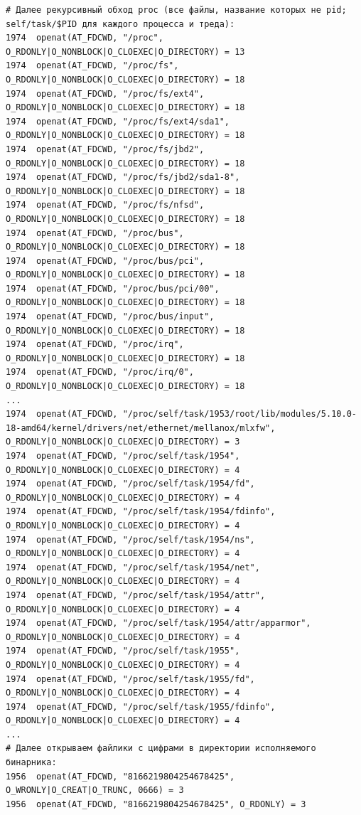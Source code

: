 \documentclass[11pt, a4paper]{article}
\begin{document}
\begin{Verbatim}[fontsize=\small,breaklines=true]
# Далее рекурсивный обход proc (все файлы, название которых не pid; self/task/$PID для каждого процесса и треда):
1974  openat(AT_FDCWD, "/proc", O_RDONLY|O_NONBLOCK|O_CLOEXEC|O_DIRECTORY) = 13
1974  openat(AT_FDCWD, "/proc/fs", O_RDONLY|O_NONBLOCK|O_CLOEXEC|O_DIRECTORY) = 18
1974  openat(AT_FDCWD, "/proc/fs/ext4", O_RDONLY|O_NONBLOCK|O_CLOEXEC|O_DIRECTORY) = 18
1974  openat(AT_FDCWD, "/proc/fs/ext4/sda1", O_RDONLY|O_NONBLOCK|O_CLOEXEC|O_DIRECTORY) = 18
1974  openat(AT_FDCWD, "/proc/fs/jbd2", O_RDONLY|O_NONBLOCK|O_CLOEXEC|O_DIRECTORY) = 18
1974  openat(AT_FDCWD, "/proc/fs/jbd2/sda1-8", O_RDONLY|O_NONBLOCK|O_CLOEXEC|O_DIRECTORY) = 18
1974  openat(AT_FDCWD, "/proc/fs/nfsd", O_RDONLY|O_NONBLOCK|O_CLOEXEC|O_DIRECTORY) = 18
1974  openat(AT_FDCWD, "/proc/bus", O_RDONLY|O_NONBLOCK|O_CLOEXEC|O_DIRECTORY) = 18
1974  openat(AT_FDCWD, "/proc/bus/pci", O_RDONLY|O_NONBLOCK|O_CLOEXEC|O_DIRECTORY) = 18
1974  openat(AT_FDCWD, "/proc/bus/pci/00", O_RDONLY|O_NONBLOCK|O_CLOEXEC|O_DIRECTORY) = 18
1974  openat(AT_FDCWD, "/proc/bus/input", O_RDONLY|O_NONBLOCK|O_CLOEXEC|O_DIRECTORY) = 18
1974  openat(AT_FDCWD, "/proc/irq", O_RDONLY|O_NONBLOCK|O_CLOEXEC|O_DIRECTORY) = 18
1974  openat(AT_FDCWD, "/proc/irq/0", O_RDONLY|O_NONBLOCK|O_CLOEXEC|O_DIRECTORY) = 18
...
1974  openat(AT_FDCWD, "/proc/self/task/1953/root/lib/modules/5.10.0-18-amd64/kernel/drivers/net/ethernet/mellanox/mlxfw", O_RDONLY|O_NONBLOCK|O_CLOEXEC|O_DIRECTORY) = 3
1974  openat(AT_FDCWD, "/proc/self/task/1954", O_RDONLY|O_NONBLOCK|O_CLOEXEC|O_DIRECTORY) = 4
1974  openat(AT_FDCWD, "/proc/self/task/1954/fd", O_RDONLY|O_NONBLOCK|O_CLOEXEC|O_DIRECTORY) = 4
1974  openat(AT_FDCWD, "/proc/self/task/1954/fdinfo", O_RDONLY|O_NONBLOCK|O_CLOEXEC|O_DIRECTORY) = 4
1974  openat(AT_FDCWD, "/proc/self/task/1954/ns", O_RDONLY|O_NONBLOCK|O_CLOEXEC|O_DIRECTORY) = 4
1974  openat(AT_FDCWD, "/proc/self/task/1954/net", O_RDONLY|O_NONBLOCK|O_CLOEXEC|O_DIRECTORY) = 4
1974  openat(AT_FDCWD, "/proc/self/task/1954/attr", O_RDONLY|O_NONBLOCK|O_CLOEXEC|O_DIRECTORY) = 4
1974  openat(AT_FDCWD, "/proc/self/task/1954/attr/apparmor", O_RDONLY|O_NONBLOCK|O_CLOEXEC|O_DIRECTORY) = 4
1974  openat(AT_FDCWD, "/proc/self/task/1955", O_RDONLY|O_NONBLOCK|O_CLOEXEC|O_DIRECTORY) = 4
1974  openat(AT_FDCWD, "/proc/self/task/1955/fd", O_RDONLY|O_NONBLOCK|O_CLOEXEC|O_DIRECTORY) = 4
1974  openat(AT_FDCWD, "/proc/self/task/1955/fdinfo", O_RDONLY|O_NONBLOCK|O_CLOEXEC|O_DIRECTORY) = 4
...
# Далее открываем файлики с цифрами в директории исполняемого бинарника:
1956  openat(AT_FDCWD, "8166219804254678425", O_WRONLY|O_CREAT|O_TRUNC, 0666) = 3
1956  openat(AT_FDCWD, "8166219804254678425", O_RDONLY) = 3

\end{Verbatim}
\end{document}
